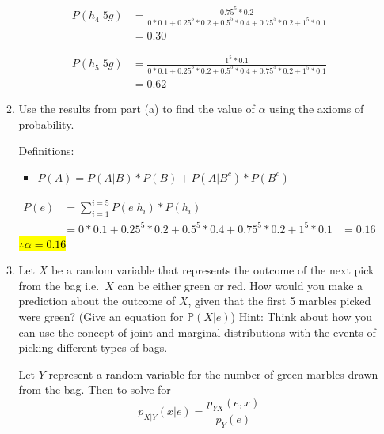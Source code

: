 \documentclass[11pt,onecolumn]{article}
\begin{document}
\begin{enumerate}
\begin{enumerate}
        \begin{equation}
            \begin{aligned}
                P(h_4 \vert 5g) &= \frac{0.75^5*0.2}{0*0.1 + 0.25^5*0.2 +  0.5^5*0.4 + 0.75^5*0.2 + 1^5*0.1} \\
                & = 0.30
            \end{aligned}
        \end{equation}

        \begin{equation}
            \begin{aligned}
                P(h_5 \vert 5g) &= \frac{1^5*0.1}{0*0.1 + 0.25^5*0.2 +  0.5^5*0.4 + 0.75^5*0.2 + 1^5*0.1} \\
                & = 0.62
            \end{aligned}
        \end{equation}
        
        \item Use the results from part (a) to find the value of $\alpha$ using the axioms of probability.
        \setlength{\parskip}{6pt}

        Definitions:
        \begin{itemize}
            \item $P(A) = P(A \vert B)*P(B) + P(A \vert B^c)*P(B^c)$
        \end{itemize}
        
        \begin{equation}
            \begin{aligned}
                P(e) & = \sum_{i=1}^{i=5}P(e \vert h_i)*P(h_i) \\ 
                    & = 0*0.1 + 0.25^5*0.2 +  0.5^5*0.4 + 0.75^5*0.2 + 1^5*0.1
                    & = 0.16
            \end{aligned}
        \end{equation}
        \hl{$\therefore \alpha = 0.16$}
        \item Let $X$ be a random variable that represents the outcome of the next pick from the bag i.e.\ $X$ can be either green or red. How would you make a prediction about the outcome of $X$, given that the first 5 marbles picked were green? (Give an equation for $\mathbb{P}(X|e)$) Hint: Think about how you can use the concept of joint and marginal distributions with the events of picking different types of bags.
        \setlength{\parskip}{6pt}

        Let $Y$ represent a random variable for the number of green marbles drawn from the bag. Then to solve for 
        \begin{equation}
            p_{X\vert Y}(x \vert e) = \frac{p_{YX}(e,x)}{p_Y(e)} 
        \end{equation}


\end{enumerate}
\end{enumerate}
\end{document}

